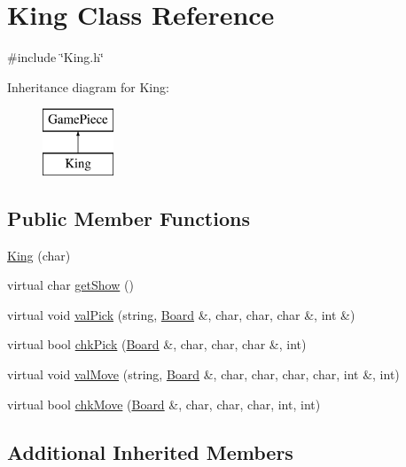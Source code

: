 \hypertarget{class_king}{\section{King Class Reference}
\label{class_king}
}


{\ttfamily \#include \char`\"{}King.\-h\char`\"{}}

Inheritance diagram for King\-:\begin{figure}[H]
\begin{center}
\leavevmode
\includegraphics[height=2.000000cm]{class_king}
\end{center}
\end{figure}
\subsection*{Public Member Functions}
\begin{DoxyCompactItemize}
\item 
\hyperlink{class_king_ae132ff90495a95b62097555ed2c069bf}{King} (char)
\item 
virtual char \hyperlink{class_king_a504e6f39d99211c0d69f3dd3a64a8a5e}{get\-Show} ()
\item 
virtual void \hyperlink{class_king_a6d35246db649771c8ef3f5cabd52d239}{val\-Pick} (string, \hyperlink{class_board}{Board} \&, char, char, char \&, int \&)
\item 
virtual bool \hyperlink{class_king_ad20f20db3007c880a5aba1e043968e70}{chk\-Pick} (\hyperlink{class_board}{Board} \&, char, char, char \&, int)
\item 
virtual void \hyperlink{class_king_ac75abcc454291598f9804d3e68817633}{val\-Move} (string, \hyperlink{class_board}{Board} \&, char, char, char, char, int \&, int)
\item 
virtual bool \hyperlink{class_king_ac18d0b1d7f928e0243041999f5a1fb81}{chk\-Move} (\hyperlink{class_board}{Board} \&, char, char, char, int, int)
\end{DoxyCompactItemize}
\subsection*{Additional Inherited Members}


